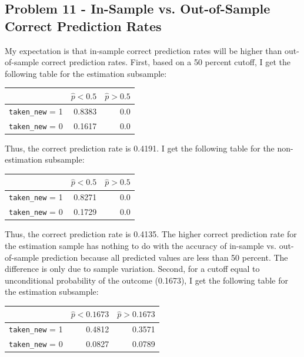 \documentclass{article}
\begin{document}
\subsection*{Problem 11 - In-Sample vs. Out-of-Sample Correct Prediction Rates}

My expectation is that in-sample correct prediction rates will be higher than out-of-sample correct prediction rates. First, based on a 50 percent cutoff, I get the following table for the estimation subsample:

\begin{center}
\begin{tabular}{ l | r r }
                   & $\hat{p} < 0.5$ & $\hat{p} > 0.5$\\ 
\hline
\texttt{taken\_new} = 1 &   0.8383 & 0.0 \\  
\texttt{taken\_new} = 0 & 0.1617   & 0.0 
\end{tabular}
\end{center}

Thus, the correct prediction rate is 0.4191. I get the following table for the non-estimation subsample:

\begin{center}
\begin{tabular}{ l | r r }
                   & $\hat{p} < 0.5$ & $\hat{p} > 0.5$\\ 
\hline
\texttt{taken\_new} = 1 &   0.8271 & 0.0 \\  
\texttt{taken\_new} = 0 & 0.1729   & 0.0 
\end{tabular}
\end{center}

Thus, the correct prediction rate is 0.4135. The higher correct prediction rate for the estimation sample has nothing to do with the accuracy of in-sample vs. out-of-sample prediction because all predicted values are less than 50 percent. The difference is only due to sample variation. Second, for a cutoff equal to unconditional probability of the outcome (0.1673), I get the following table for the estimation subsample:

\begin{center}
\begin{tabular}{ l | r r }
 & $\hat{p} < 0.1673$ & $\hat{p} > 0.1673$\\ 
\hline
\texttt{taken\_new} = 1 & 0.4812 & 0.3571 \\  
\texttt{taken\_new} = 0 & 0.0827 & 0.0789
\end{tabular}
\end{center}
\end{document}
